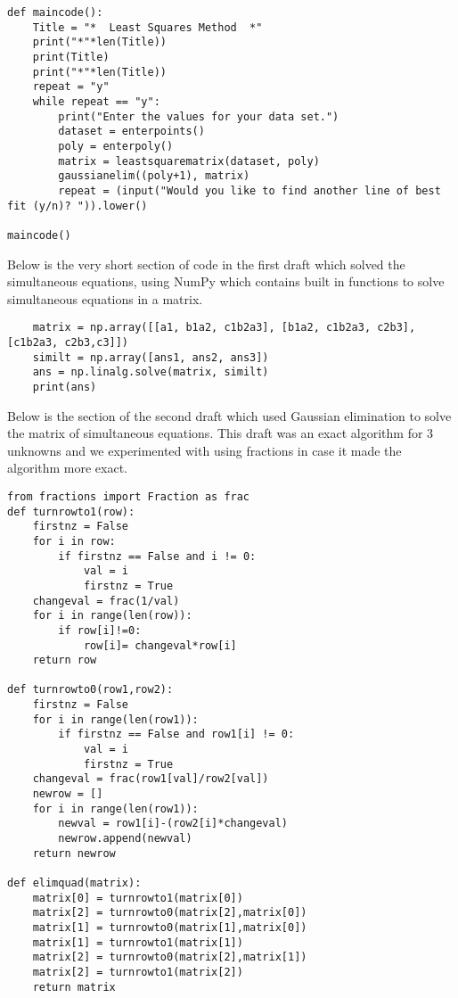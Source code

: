 \documentclass{article}
\begin{document}
\begin{lstlisting}
def maincode():
    Title = "*  Least Squares Method  *"
    print("*"*len(Title))
    print(Title)
    print("*"*len(Title))
    repeat = "y"
    while repeat == "y":
        print("Enter the values for your data set.")
        dataset = enterpoints()
        poly = enterpoly()
        matrix = leastsquarematrix(dataset, poly)
        gaussianelim((poly+1), matrix)
        repeat = (input("Would you like to find another line of best fit (y/n)? ")).lower()
        
maincode()

\end{lstlisting}



Below is the very short section of code in the first draft which solved the simultaneous equations, using NumPy which contains built in functions to solve simultaneous equations in a matrix.

\lstset{language=Python}
\lstset{frame=lines}
\lstset{basicstyle=\footnotesize}
\begin{lstlisting}
    matrix = np.array([[a1, b1a2, c1b2a3], [b1a2, c1b2a3, c2b3],[c1b2a3, c2b3,c3]])
    similt = np.array([ans1, ans2, ans3])
    ans = np.linalg.solve(matrix, similt)
    print(ans)
\end{lstlisting}

Below is the section of the second draft which used Gaussian elimination to solve the matrix of simultaneous equations. This draft was an exact algorithm for 3 unknowns and we experimented with using fractions in case it made the algorithm more exact.

\lstset{language=Python}
\lstset{frame=lines}
\lstset{basicstyle=\footnotesize}
\begin{lstlisting}
from fractions import Fraction as frac
def turnrowto1(row):
    firstnz = False
    for i in row:
        if firstnz == False and i != 0:
            val = i
            firstnz = True
    changeval = frac(1/val)
    for i in range(len(row)):
        if row[i]!=0:
            row[i]= changeval*row[i]
    return row

def turnrowto0(row1,row2):
    firstnz = False
    for i in range(len(row1)):
        if firstnz == False and row1[i] != 0:
            val = i
            firstnz = True
    changeval = frac(row1[val]/row2[val])
    newrow = []
    for i in range(len(row1)):
        newval = row1[i]-(row2[i]*changeval)
        newrow.append(newval)
    return newrow

def elimquad(matrix):
    matrix[0] = turnrowto1(matrix[0])
    matrix[2] = turnrowto0(matrix[2],matrix[0])
    matrix[1] = turnrowto0(matrix[1],matrix[0])
    matrix[1] = turnrowto1(matrix[1])
    matrix[2] = turnrowto0(matrix[2],matrix[1])
    matrix[2] = turnrowto1(matrix[2])
    return matrix
\end{lstlisting}
\end{document}
